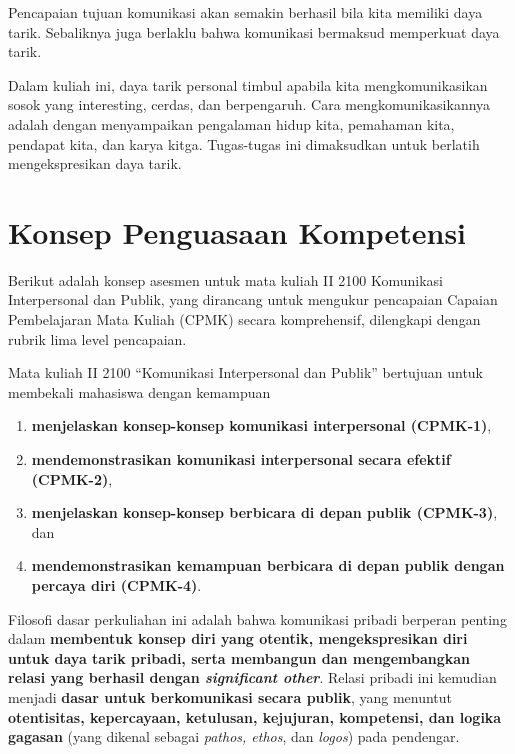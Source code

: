 \documentclass[
  letterpaper,
  DIV=11,
  numbers=noendperiod]{scrreprt}
\begin{document}
Pencapaian tujuan komunikasi akan semakin berhasil bila kita memiliki
daya tarik. Sebaliknya juga berlaklu bahwa komunikasi bermaksud
memperkuat daya tarik.

Dalam kuliah ini, daya tarik personal timbul apabila kita
mengkomunikasikan sosok yang interesting, cerdas, dan berpengaruh. Cara
mengkomunikasikannya adalah dengan menyampaikan pengalaman hidup kita,
pemahaman kita, pendapat kita, dan karya kitga. Tugas-tugas ini
dimaksudkan untuk berlatih mengekspresikan daya tarik.

\section*{Konsep Penguasaan
Kompetensi}\label{konsep-penguasaan-kompetensi}


Berikut adalah konsep asesmen untuk mata kuliah II 2100 Komunikasi
Interpersonal dan Publik, yang dirancang untuk mengukur pencapaian
Capaian Pembelajaran Mata Kuliah (CPMK) secara komprehensif, dilengkapi
dengan rubrik lima level pencapaian.

Mata kuliah II 2100 ``Komunikasi Interpersonal dan Publik'' bertujuan
untuk membekali mahasiswa dengan kemampuan

\begin{enumerate}
\def\labelenumi{\arabic{enumi}.}
\item
  \textbf{menjelaskan konsep-konsep komunikasi interpersonal (CPMK-1)},
\item
  \textbf{mendemonstrasikan komunikasi interpersonal secara efektif
  (CPMK-2)},
\item
  \textbf{menjelaskan konsep-konsep berbicara di depan publik (CPMK-3)},
  dan
\item
  \textbf{mendemonstrasikan kemampuan berbicara di depan publik dengan
  percaya diri (CPMK-4)}.
\end{enumerate}

Filosofi dasar perkuliahan ini adalah bahwa komunikasi pribadi berperan
penting dalam \textbf{membentuk konsep diri yang otentik,
mengekspresikan diri untuk daya tarik pribadi, serta membangun dan
mengembangkan relasi yang berhasil dengan \emph{significant other}}.
Relasi pribadi ini kemudian menjadi \textbf{dasar untuk berkomunikasi
secara publik}, yang menuntut \textbf{otentisitas, kepercayaan,
ketulusan, kejujuran, kompetensi, dan logika gagasan} (yang dikenal
sebagai \emph{pathos, ethos}, dan \emph{logos}) pada pendengar.
\end{document}

